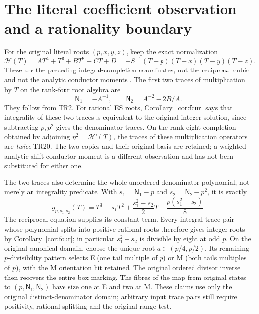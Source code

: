\section{The literal coefficient observation and a rationality boundary}
For the original literal roots $(p,x,y,z)$, keep the exact normalization
\[
 \mathcal H(T)=AT^4+T^3+BT^2+CT+D
              =-S^{-1}(T-p)(T-x)(T-y)(T-z).
\]
These are the preceding integral-completion coordinates, not the reciprocal
cubic and not the analytic conductor moments \cite[IC4--IC5]{Previous}.
The first two traces of multiplication by $T$ on the rank-four root algebra are
\[
 \boxed{\mathsf N_1=-A^{-1},\qquad
 \mathsf N_2=A^{-2}-2B/A.}                              \tag{TR20}
\]
They follow from TR2. For rational ES roots, Corollary~\ref{cor:four} says that
integrality of these two traces is equivalent to the original integer
solution, since subtracting $p,p^2$ gives the denominator traces. On the rank-eight
completion obtained by adjoining $\eta^2=\mathcal H'(T)$, the traces of these
multiplication operators are \emph{twice} TR20. The two copies and their original
basis are retained; a weighted analytic shift-conductor moment is a different
observation and has not been substituted for either one.

The two traces also determine the whole unordered denominator polynomial, not
merely an integrality predicate. With $s_1=\mathsf N_1-p$ and
$s_2=\mathsf N_2-p^2$, it is exactly
\[
 \boxed{g_{p,s_1,s_2}(T)=T^3-s_1T^2+
 \frac{s_1^2-s_2}{2}T-\frac{p(s_1^2-s_2)}8.}             \tag{TR20a}
\]
The reciprocal equation supplies its constant term. Every integral trace pair
whose polynomial splits into positive rational roots therefore gives integer
roots by Corollary~\ref{cor:four}; in particular $s_1^2-s_2$ is divisible by
eight at odd $p$. On the original canonical domain, choose the unique root
$a\in(p/4,p/2)$. Its remaining $p$-divisibility pattern selects E (one tail
multiple of $p$) or M (both tails multiples of $p$), with the M orientation bit
retained. The original ordered divisor inverse then recovers the entire box
marking. The fibres of the map from original states to
$(p,\mathsf N_1,\mathsf N_2)$ have size one at E and two at M. These claims use
only the original distinct-denominator domain; arbitrary input trace pairs
still require positivity, rational splitting and the original range test.

